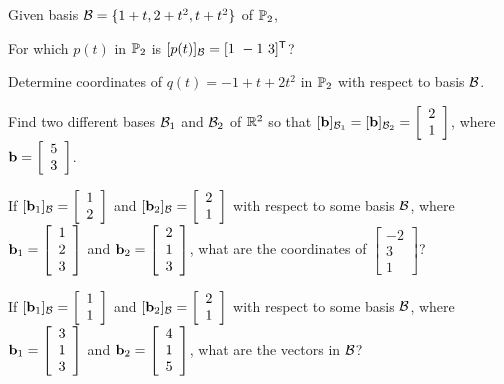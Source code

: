\item Given basis $\mathcal{B}=\{1+t, 2+t^2, t+t^2\}$ of $\mathbb{P}_2$,
\ba 
\item For which $p(t)$ in $\mathbb{P}_2$ is $[p(t)]_{\mathcal{B}} = [ 1 \ -1 \ 3 ]^{\mathsf{T}}$?

\item Determine coordinates of $q(t)=-1+t+2t^2$ in $\mathbb{P}_2$ with respect to basis $\mathcal{B}$.
\ea

\item Find two different bases $\mathcal{B}_1$ and $\mathcal{B}_2$ of $\mathbb{R}^2$ so that $[\mathbf{b}]_{\mathcal{B}_1} = [\mathbf{b}]_{\mathcal{B}_2} = \left[ \begin{array}{c} 2\\1 \end{array}\right]$, where $\mathbf{b}=\left[ \begin{array}{c} 5\\3 \end{array} \right]$.

\item If  $[\mathbf{b}_1]_{\mathcal{B}} = \left[ \begin{array}{c} 1\\2 \end{array} \right]$ and $[\mathbf{b}_2]_{\mathcal{B}} = \left[ \begin{array}{c} 2\\1 \end{array} \right]$ with respect to some basis $\mathcal{B}$, where $\mathbf{b}_1=\left[ \begin{array}{c} 1\\2\\3 \end{array} \right]$ and $\mathbf{b}_2=\left[ \begin{array}{c} 2\\1\\3 \end{array} \right]$, what are the coordinates of $\left[ \begin{array}{r} -2\\3\\1 \end{array} \right]$?

\item If $[\mathbf{b}_1]_{\mathcal{B}} = \left[ \begin{array}{c} 1\\1 \end{array} \right]$ and $[\mathbf{b}_2]_{\mathcal{B}} = \left[ \begin{array}{c} 2\\1 \end{array} \right]$ with respect to some basis $\mathcal{B}$, where  $\mathbf{b}_1=\left[ \begin{array}{c} 3\\1\\3 \end{array} \right]$ and $\mathbf{b}_2=\left[ \begin{array}{c} 4\\1\\5 \end{array} \right]$, what are the vectors in $\mathcal{B}$?

